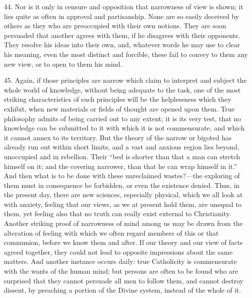 44. Nor is it only in censure and opposition that narrowness of
view is shown; it lies quite as often in approval and partisanship.
None are so easily deceived by others as they who are preoccupied with
their own notions. They are soon persuaded that another agrees with
them, if he disagrees with their opponents. They resolve his ideas
into their own, and, whatever words he may use to clear his meaning,
even the most distinct and forcible, these fail to convey to them any
new view, or to open to them his mind.

45. Again, if those principles are narrow which claim to interpret
and subject the whole world of knowledge, without being adequate to
the task, one of the most striking characteristics of such principles
will be the helplessness which they exhibit, when new materials or
fields of thought are opened upon them. True philosophy admits of
being carried out to any extent; it is its very test, that no
knowledge can be submitted to it with which it is not commensurate,
and which it cannot annex to its territory. But the theory of the
narrow or bigoted has already run out within short limits, and a vast
and anxious region lies beyond, unoccupied and in rebellion. Their
``bed is shorter than that a man can stretch himself on it; and
the covering narrower, than that he can wrap himself in it.'' And
then what is to be done with these unreclaimed wastes?—the exploring
of them must in consequence be forbidden, or even the existence
denied. Thus, in the present day, there are new sciences, especially
physical, which we all look at with anxiety, feeling that our views,
as we at present hold them, are unequal to them, yet feeling also that
no truth can really exist external to Christianity. Another striking
proof of narrowness of mind among us may be drawn from the alteration
of feeling with which we often regard members of this or that
communion, before we know them and after. If our theory and our view
of facts agreed together, they could not lead to opposite impressions
about the same matters. And another instance occurs daily: true
Catholicity is commensurate with the wants of the human mind; but
persons are often to be found who are surprised that they cannot
persuade all men to follow them, and cannot destroy dissent, by
preaching a portion of the Divine system, instead of the whole of it.

